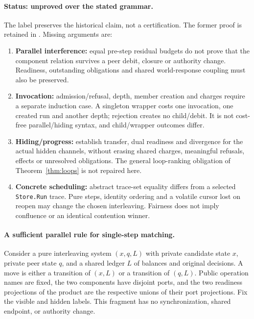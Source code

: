 \documentclass[11pt,a4paper]{article}
\theoremstyle{definition}
\theoremstyle{remark}
\begin{document}
\paragraph{Status: unproved over the stated grammar.} The label preserves the historical claim, not a certification. The former proof is retained in . Missing arguments are:
\begin{enumerate}
\item \textbf{Parallel interference:} equal pre-step residual budgets do not prove that the component relation survives a peer debit, closure or authority change. Readiness, outstanding obligations and shared world-response coupling must also be preserved.
\item \textbf{Invocation:} admission/refusal, depth, member creation and charges require a separate induction case. A singleton wrapper costs one invocation, one created run and another depth; rejection creates no child/debit. It is not cost-free parallel/hiding syntax, and child/wrapper outcomes differ.
\item \textbf{Hiding/progress:} establish transfer, dual readiness and divergence for the actual hidden channels, without erasing shared charges, meaningful refusals, effects or unresolved obligations. The general loop-ranking obligation of Theorem~\ref{thm:loops} is not repaired here.
\item \textbf{Concrete scheduling:} abstract trace-set equality differs from a selected \texttt{Store.Run} trace. Pure steps, identity ordering and a volatile cursor lost on reopen may change the chosen interleaving. Fairness does not imply confluence or an identical contention winner.
\end{enumerate}

\paragraph{A sufficient parallel rule for single-step matching.} Consider a pure interleaving system $(x,q,L)$ with private candidate state $x$, private peer state $q$, and a shared ledger $L$ of balances and original decisions. A move is either a transition of $(x,L)$ or a transition of $(q,L)$. Public operation names are fixed, the two components have disjoint ports, and the two readiness projections of the product are the respective unions of their port projections. Fix the visible and hidden labels. This fragment has no synchronization, shared endpoint, or authority change.
\end{document}
